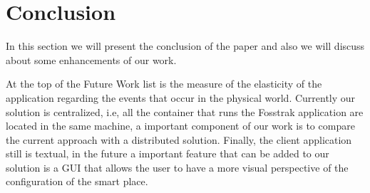 \section{Conclusion}
\label{sec:conclusion}
In this section we will present the conclusion of the paper and also we will discuss about some
enhancements of our work.

At the top of the Future Work list is the measure of the elasticity of the application regarding
the events that occur in the physical world. Currently our solution is centralized, i.e, all the
container that runs the Fosstrak application are located in the same machine, a important component
of our work is to compare the current approach with a distributed solution. Finally, the client
application still is textual, in the future a important feature that can be added to our solution
is a GUI that allows the user to have a more visual perspective of the configuration of the smart
place.
